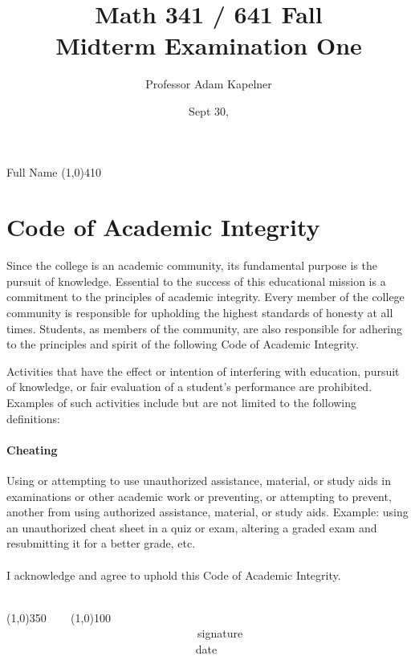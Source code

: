 \documentclass[12pt]{article}
\title{Math 341 / 641 Fall \the\year{} \\ Midterm Examination One}
\author{Professor Adam Kapelner}
\date{Sept 30, \the\year{}}
\begin{document}
\maketitle

\noindent Full Name \line(1,0){410}

\thispagestyle{empty}

\section*{Code of Academic Integrity}

\footnotesize
Since the college is an academic community, its fundamental purpose is the pursuit of knowledge. Essential to the success of this educational mission is a commitment to the principles of academic integrity. Every member of the college community is responsible for upholding the highest standards of honesty at all times. Students, as members of the community, are also responsible for adhering to the principles and spirit of the following Code of Academic Integrity.

Activities that have the effect or intention of interfering with education, pursuit of knowledge, or fair evaluation of a student's performance are prohibited. Examples of such activities include but are not limited to the following definitions:

\paragraph{Cheating} Using or attempting to use unauthorized assistance, material, or study aids in examinations or other academic work or preventing, or attempting to prevent, another from using authorized assistance, material, or study aids. Example: using an unauthorized cheat sheet in a quiz or exam, altering a graded exam and resubmitting it for a better grade, etc.\\
\\
\noindent I acknowledge and agree to uphold this Code of Academic Integrity. \\~\\

\begin{center}
\line(1,0){350} ~~~ \line(1,0){100}\\
~~~~~~~~~~~~~~~~~~~~~~~~~~~~~~~~~~signature~~~~~~~~~~~~~~~~~~~~~~~~~~~~~~~~~~~~~~~~~~~~~~~~~~~~~~~~~~~~~~ date
\end{center}

\normalsize
\end{document}
